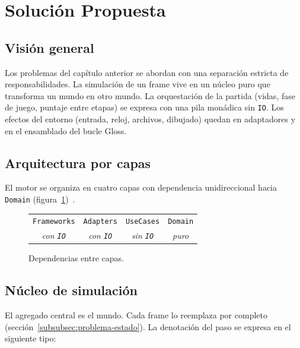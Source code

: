 \section{Solución Propuesta}
\label{sec:solucion-propuesta}

\subsection{Visión general}
\label{subsec:solucion-vision}

Los problemas del capítulo anterior se abordan con una separación estricta de
responsabilidades. La simulación de un frame vive en un núcleo puro que transforma un
mundo en otro mundo. La orquestación de la partida (vidas, fase de juego, puntaje entre
etapas) se expresa con una pila monádica sin \texttt{IO}. Los efectos del entorno (entrada,
reloj, archivos, dibujado) quedan en adaptadores y en el ensamblado del bucle Gloss.

\subsection{Arquitectura por capas}
\label{subsec:solucion-capas}

El motor se organiza en cuatro capas con dependencia unidireccional hacia \texttt{Domain}
(figura~\ref{fig:capas-dependencias})~\cite{cockburn2005hexagonal}.

\begin{figure}[htbp]
  \centering
  \begin{tabular}{c @{\quad$\rightarrow$\quad} c @{\quad$\rightarrow$\quad} c @{\quad$\rightarrow$\quad} c}
    \texttt{Frameworks} & \texttt{Adapters} & \texttt{UseCases} & \texttt{Domain} \\
    \textit{con \texttt{IO}} & \textit{con \texttt{IO}} & \textit{sin \texttt{IO}} & \textit{puro}
  \end{tabular}
  \caption{Dependencias entre capas.}
  \label{fig:capas-dependencias}
\end{figure}

\subsection{Núcleo de simulación}
\label{subsec:solucion-nucleo}

El agregado central es el mundo. Cada frame lo reemplaza por completo
(sección~\ref{subsubsec:problema-estado}). La denotación del paso se expresa en el
siguiente tipo:

